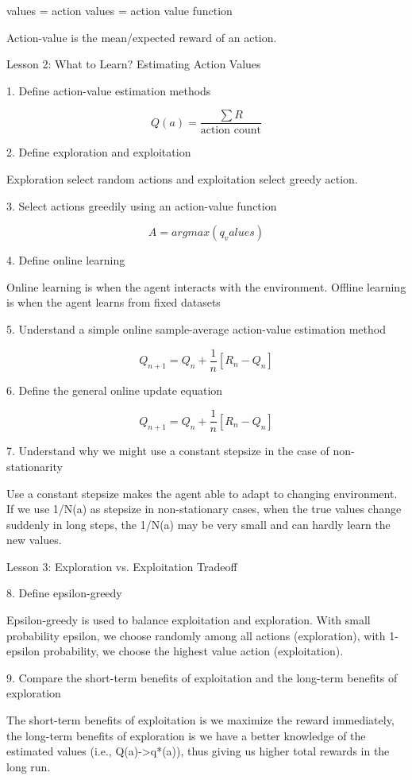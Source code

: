 \documentclass[lang=en,mode=geye,device=normal,color=blue,14pt]{elegantnote}
\DeclareMathOperator*{\1}{\mathbbm{1}}
\begin{document}
values = action values = action value function

Action-value is the mean/expected reward of an action.


Lesson 2: What to Learn? Estimating Action Values

1. Define action-value estimation methods

$$Q(a) = \frac{\sum R}{\text{action count}}$$

2. Define exploration and exploitation

Exploration select random actions and exploitation select greedy action.

3. Select actions greedily using an action-value function

$$A = argmax(q_values)$$

4. Define online learning

Online learning is when the agent interacts with the environment.
Offline learning is when the agent learns from fixed datasets

5. Understand a simple online sample-average action-value estimation method

$$Q_{n+1} = Q_n + \frac{1}{n}[R_n - Q_n]$$

6. Define the general online update equation

$$Q_{n+1} = Q_n + \frac{1}{n}[R_n - Q_n]$$

7. Understand why we might use a constant stepsize in the case of non-stationarity

Use a constant stepsize makes the agent able to adapt to changing environment.
If we use 1/N(a) as stepsize in non-stationary cases, when the true values change suddenly in long steps, the 1/N(a) may be very small and can hardly learn the new values.

Lesson 3: Exploration vs. Exploitation Tradeoff

8. Define epsilon-greedy

Epsilon-greedy is used to balance exploitation and exploration. With small probability epsilon, we choose randomly among all actions (exploration), with 1-epsilon probability, we choose the highest value action (exploitation).

9. Compare the short-term benefits of exploitation and the long-term benefits of exploration

The short-term benefits of exploitation is we maximize the reward immediately, the long-term benefits of exploration is we have a better knowledge of the estimated values (i.e., Q(a)->q*(a)), thus giving us higher total rewards in the long run.
\end{document}
